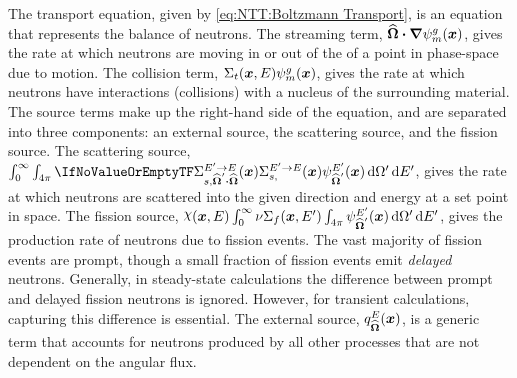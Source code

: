 {{        The transport equation, given by \cref{eq:NTT:Boltzmann Transport}, is an equation that represents the balance of neutrons.
        The streaming term, $\dir\vdot\grad\aflux$, gives the rate at which neutrons are moving in or out of the of a point in phase-space due to motion.
        The collision term, $\xst[\loc][E]\aflux$, gives the rate at which neutrons have interactions (collisions) with a nucleus of the surrounding material.
        The source terms make up the right-hand side of the equation, and are separated into three components: an external source, the scattering source, and the fission source.
        The scattering source, $\intl[0][\infty]\intl[\fourpi]\xss[][\loc][\dirprime\vdot\dir][\Eprime\to E]\aflux[\loc][\dirprime][\Eprime]\ddirprime\dif{\Eprime}$, gives the rate at which neutrons are scattered into the given direction and energy at a set point in space.
        The fission source, $\spect\intl[0][\infty]\nufis[\loc][\Eprime]\intl[\fourpi]\aflux[\loc][\dirprime][\Eprime]\ddirprime\dif{\Eprime}$, gives the production rate of neutrons due to fission events.
        The vast majority of fission events are prompt, though a small fraction of fission events emit \emph{delayed} neutrons.
        Generally, in steady-state calculations the difference between prompt and delayed fission neutrons is ignored.
        However, for transient calculations, capturing this difference is essential.
        The external source, $\source[\loc][\dir][E]$, is a generic term that accounts for neutrons produced by all other processes that are not dependent on the angular flux.

}}

